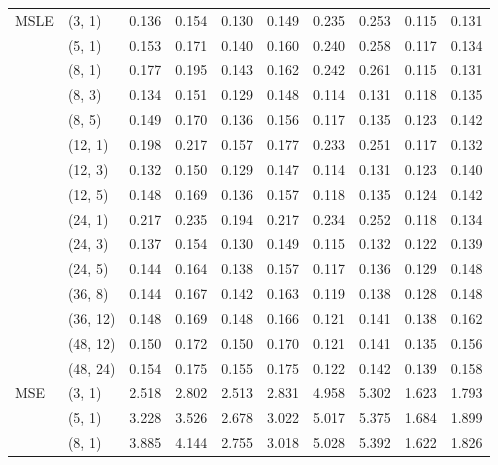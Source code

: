 \begin{longtable}{ll|rr|rr|rr|rr}
\hline \multirow{15}{*}{MSLE}  & (3, 1) &     0.136 &      0.154 &   0.130 &    0.149 &    0.235 &     0.253 &  0.115 &   0.131 \\
      & (5, 1) &     0.153 &      0.171 &   0.140 &    0.160 &    0.240 &     0.258 &  0.117 &   0.134 \\
      & (8, 1) &     0.177 &      0.195 &   0.143 &    0.162 &    0.242 &     0.261 &  0.115 &   0.131 \\
      & (8, 3) &     0.134 &      0.151 &   0.129 &    0.148 &    0.114 &     0.131 &  0.118 &   0.135 \\
      & (8, 5) &     0.149 &      0.170 &   0.136 &    0.156 &    0.117 &     0.135 &  0.123 &   0.142 \\
      & (12, 1) &     0.198 &      0.217 &   0.157 &    0.177 &    0.233 &     0.251 &  0.117 &   0.132 \\
      & (12, 3) &     0.132 &      0.150 &   0.129 &    0.147 &    0.114 &     0.131 &  0.123 &   0.140 \\
      & (12, 5) &     0.148 &      0.169 &   0.136 &    0.157 &    0.118 &     0.135 &  0.124 &   0.142 \\
      & (24, 1) &     0.217 &      0.235 &   0.194 &    0.217 &    0.234 &     0.252 &  0.118 &   0.134 \\
      & (24, 3) &     0.137 &      0.154 &   0.130 &    0.149 &    0.115 &     0.132 &  0.122 &   0.139 \\
      & (24, 5) &     0.144 &      0.164 &   0.138 &    0.157 &    0.117 &     0.136 &  0.129 &   0.148 \\
      & (36, 8) &     0.144 &      0.167 &   0.142 &    0.163 &    0.119 &     0.138 &  0.128 &   0.148 \\
      & (36, 12) &     0.148 &      0.169 &   0.148 &    0.166 &    0.121 &     0.141 &  0.138 &   0.162 \\
      & (48, 12) &     0.150 &      0.172 &   0.150 &    0.170 &    0.121 &     0.141 &  0.135 &   0.156 \\
      & (48, 24) &     0.154 &      0.175 &   0.155 &    0.175 &    0.122 &     0.142 &  0.139 &   0.158 \\
\hline 
\multirow{15}{*}{MSE} & (3, 1) &     2.518 &      2.802 &   2.513 &    2.831 &    4.958 &     5.302 &  1.623 &   1.793 \\
      & (5, 1) &     3.228 &      3.526 &   2.678 &    3.022 &    5.017 &     5.375 &  1.684 &   1.899 \\
      & (8, 1) &     3.885 &      4.144 &   2.755 &    3.018 &    5.028 &     5.392 &  1.622 &   1.826 \\

\end{longtable}
